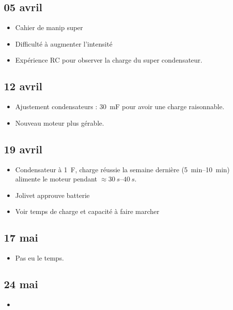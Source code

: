 \documentclass[a4paper, 11pt, final, garamond]{book}
\begin{document}
\subsection{05 avril}
\begin{itemize}
	\item Cahier de manip super
	\item Difficulté à augmenter l'intensité
	\item Expérience RC pour observer la charge du super condensateur.
\end{itemize}

\subsection{12 avril}
\begin{itemize}
	\item Ajustement condensateurs : \SI{30}{mF} pour avoir une charge
	      raisonnable.
	\item Nouveau moteur plus gérable.
\end{itemize}

\subsection{19 avril}
\begin{itemize}
	\item Condensateur à \SI{1}{F}, charge réussie la semaine dernière
	      (\SIrange{5}{10}{min}) alimente le moteur pendant $\approx
		      \SIrange{30}{40}{s}$.
	\item Jolivet approuve batterie
	\item Voir temps de charge et capacité à faire marcher
\end{itemize}

\subsection{17 mai}
\begin{itemize}
	\item Pas eu le temps.
\end{itemize}

\subsection{24 mai}
\begin{itemize}
	\item
\end{itemize}
\end{document}
